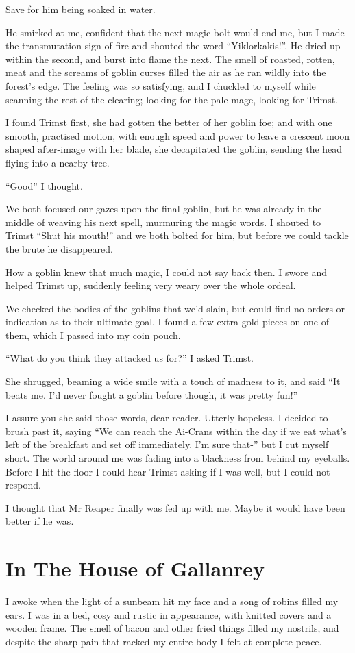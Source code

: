 \documentclass[12pt, a4paper]{book}
\begin{document}
Save for him being soaked in water. 

He smirked at me, confident that the next magic bolt would end me, but I made the transmutation sign of fire and shouted the word ``Yiklorkakis!''. He dried up within the second, and burst into flame the next. The smell of roasted, rotten, meat and the screams of goblin curses filled the air as he ran wildly into the forest's edge. The feeling was so satisfying, and I chuckled to myself while scanning the rest of the clearing; looking for the pale mage, looking for Trimst.

I found Trimst first, she had gotten the better of her goblin foe; and with one smooth, practised motion, with enough speed and power to leave a crescent moon shaped after-image with her blade, she decapitated the goblin, sending the head flying into a nearby tree.

``Good'' I thought.

We both focused our gazes upon the final goblin, but he was already in the middle of weaving his next spell, murmuring the magic words. I shouted to Trimst ``Shut his mouth!'' and we both bolted for him, but before we could tackle the brute he disappeared. 

How a goblin knew that much magic, I could not say back then. I swore and helped Trimst up, suddenly feeling very weary over the whole ordeal.

We checked the bodies of the goblins that we'd slain, but could find no orders or indication as to their ultimate goal. I found a few extra gold pieces on one of them, which I passed into my coin pouch.

``What do you think they attacked us for?'' I asked Trimst.

She shrugged, beaming a wide smile with a touch of madness to it, and said ``It beats me. I'd never fought a goblin before though, it was pretty fun!''

I assure you she said those words, dear reader. Utterly hopeless. I decided to brush past it, saying ``We can reach the Ai-Crans within the day if we eat what's left of the breakfast and set off immediately. I'm sure that-'' but I cut myself short. The world around me was fading into a blackness from behind my eyeballs. Before I hit the floor I could hear Trimst asking if I was well, but I could not respond.

I thought that Mr Reaper finally was fed up with me. Maybe it would have been better if he was.

\chapter{In The House of Gallanrey}
I awoke when the light of a sunbeam hit my face and a song of robins filled my ears. I was in a bed, cosy and rustic in appearance, with knitted covers and a wooden frame. The smell of bacon and other fried things filled my nostrils, and despite the sharp pain that racked my entire body I felt at complete peace.
\end{document}
